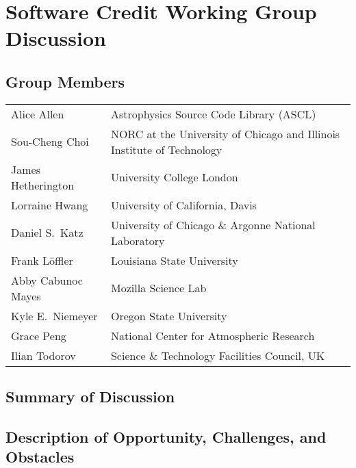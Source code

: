 \section{Software Credit Working Group Discussion}
\label{sec:appendix_SW_credit}

\subsection{Group Members}
{\small
\begin{longtable}{ll}
   Alice Allen            &  Astrophysics Source Code Library (ASCL)
\\ Sou-Cheng Choi         &  NORC at the University of Chicago and Illinois Institute of Technology
\\ James Hetherington     &  University College London
\\ Lorraine Hwang         &  University of California, Davis
\\ Daniel S.\ Katz        &  University of Chicago \& Argonne National Laboratory
\\ Frank Löffler          &  Louisiana State University
\\ Abby Cabunoc Mayes     &  Mozilla Science Lab
\\ Kyle E.\ Niemeyer      &  Oregon State University
\\ Grace Peng             &  National Center for Atmospheric Research
\\ Ilian Todorov          &  Science \& Technology Facilities Council, UK
\end{longtable}
}

\subsection{Summary of Discussion}


\subsection{Description of Opportunity, Challenges, and Obstacles}


